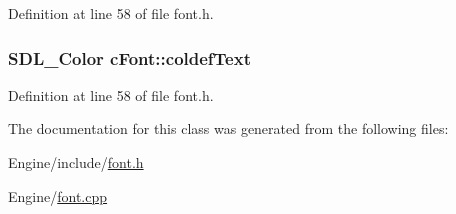 Definition at line 58 of file font.\-h.

\hypertarget{classc_font_a96a95a892c62f8097c0da7388bc7b948}{
\subsubsection[{coldef\-Text}]{\setlength{\rightskip}{0pt plus 5cm}S\-D\-L\-\_\-\-Color c\-Font\-::coldef\-Text}}\label{classc_font_a96a95a892c62f8097c0da7388bc7b948}


Definition at line 58 of file font.\-h.



The documentation for this class was generated from the following files\-:\begin{DoxyCompactItemize}
\item 
Engine/include/\hyperlink{font_8h}{font.\-h}\item 
Engine/\hyperlink{font_8cpp}{font.\-cpp}\end{DoxyCompactItemize}
